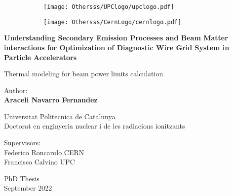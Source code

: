 \begin{titlepage}
    \begin{center}
        \begin{figure}
            \centering
            
            
            \begin{subfigure}[b]{0.5\textwidth}
                \centering
                \texttt{[image: Othersss/UPClogo/upclogo.pdf]}
                \vspace{0.35cm}
            \end{subfigure}
            \hspace{3cm}
            \begin{subfigure}[b]{0.2\textwidth}
                \centering
                \texttt{[image: Othersss/CernLogo/cernlogo.pdf]}
            \end{subfigure}
        \end{figure}

        
        \vspace*{1cm}
        \Large
        \textbf{Understanding Secondary Emission Processes and Beam Matter interactions for Optimization of Diagnostic Wire Grid System in Particle Accelerators}
        
        \vspace{0.5cm}
        \Large
        Thermal modeling for beam power limits calculation

        \vspace{1.5cm}
        \large
        Author: \\

        \textbf{Araceli Navarro Fernandez}

        \vspace{2cm}
        Universitat Politecnica de Catalunya \\

        Doctorat en enginyeria nuclear i de les radiacions ionitzants

        \vspace{2cm}


        Supervisors: \\

        Federico Roncarolo \hspace{4cm} CERN \\

        Francisco Calvino \hspace{4cm} UPC
        

      
        \vfill
        PhD Thesis
        \\
        September 2022


    \end{center}
\end{titlepage}